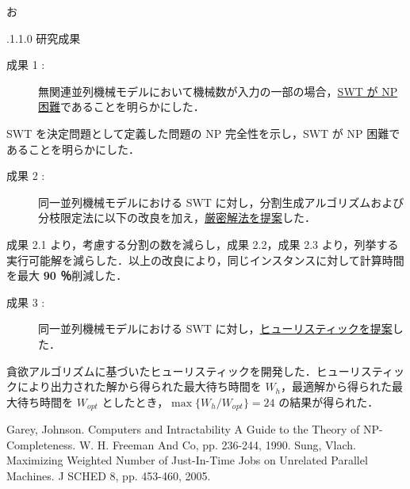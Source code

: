 お\documentclass[oneside, 10pt, twocolumn]{jarticle}
\makeatletter
\def\section{\@startsection {section}{1}{\z@}{-3.5ex plus -1ex minus
-.2ex}{2.3 ex plus .2ex}{\large\bf}}
\renewcommand{\section}{
\@startsection{section}{1}{\z@}
{.1\Cvs \@plus.0\Cdp \@minus.1\Cdp}%
{.1\Cvs \@plus.1\Cdp \@minus.0\Cdp}%
{\reset@font\large\bfseries}}      %
\makeatother
\begin{document}
\section{研究成果}
\begin{description}
  \item[成果 1 : ]
  無関連並列機械モデルにおいて機械数が入力の一部の場合，\underline{SWT が NP 困難}であることを明らかにした．
\end{description}
SWT を決定問題として定義した問題の NP 完全性を示し，SWT が NP 困難であることを明らかにした．

\begin{description}
  \item[成果 2 : ]
  同一並列機械モデルにおける SWT に対し，分割生成アルゴリズムおよび分枝限定法に以下の改良を加え，\underline{厳密解法を提案}した．
\end{description}
成果 2.1 より，考慮する分割の数を減らし，成果 2.2，成果 2.3 より，列挙する実行可能解を減らした．以上の改良により，同じインスタンスに対して計算時間を最大 {\bf 90 ％}削減した．

\begin{description}
  \item[成果 3 : ]
  同一並列機械モデルにおける SWT に対し，\underline{ヒューリスティックを提案}した．
\end{description}
貪欲アルゴリズムに基づいたヒューリスティックを開発した．ヒューリスティックにより出力された解から得られた最大待ち時間を $W_h$，最適解から得られた最大待ち時間を $W_{opt}$ としたとき，\mbox{\boldmath $\max\big\{W_h/W_{opt}\big\} = 24$} の結果が得られた．

\begin{thebibliography}{9} %
  Garey, Johnson.
  Computers and Intractability A Guide to the Theory of NP-Completeness.
  W. H. Freeman And Co, pp. 236-244, 1990.
  \vspace{-2mm}
  Sung, Vlach.
  Maximizing Weighted Number of Just-In-Time Jobs on Unrelated Parallel Machines. J SCHED 8, pp. 453-460, 2005.
\end{thebibliography}
\end{document}

